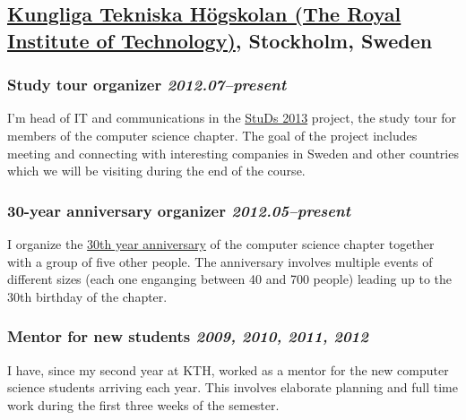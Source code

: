 \documentclass[a4paper,11pt]{article}
\newcommand{\icon}[1]{\textcolor{lightgray}{#1}}
\newcommand{\iconl}[1]{\hspace{-0.5cm}\makebox[0.3cm][c]{\icon{#1}}\hspace{0.2cm}}
\newcommand{\worktitle}[1]{\textbf{#1}}
\newcommand{\duration}[1]{\textsl{#1}}
\newcommand{\theplace}[2][]{\subsection*{\textbf{#2}#1}}
\newcommand{\thework}[2]{\subsubsection*{%
  \iconl{$\blacksquare$}%
  \worktitle{#1}%
  \hfill\duration{#2}}\par%
}
\begin{document}
\theplace[, Stockholm, Sweden]{\href{http://kth.se}{Kungliga Tekniska Högskolan (The Royal Institute of Technology)}}

\thework{Study tour organizer}{2012.07--present}
I'm head of IT and communications in the \href{http://studieresan.se}{StuDs 2013} project, the study tour for members of the computer science chapter. The goal of the project includes meeting and connecting with interesting companies in Sweden and other countries which we will be visiting during the end of the course.

\thework{30-year anniversary organizer}{2012.05--present}
I organize the \href{http://djubileet.se/}{30th year anniversary} of the computer science chapter together with a group of five other people. The anniversary involves multiple events of different sizes (each one enganging between 40 and 700 people) leading up to the 30th birthday of the chapter.

\thework{Mentor for new students}{2009, 2010, 2011, 2012}
I have, since my second year at KTH, worked as a mentor for the new computer science students arriving each year. This involves elaborate planning and full time work during the first three weeks of the semester.
\end{document}
